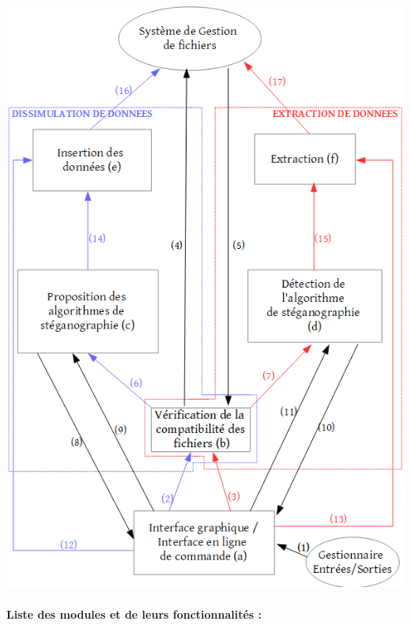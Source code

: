 \documentclass[11pt]{article}
\begin{document}
\hspace{0cm}
\includegraphics[scale=0.75]{pictures/organigramme.png}

\paragraph{Liste des modules et de leurs fonctionnalités :}
\end{document}
